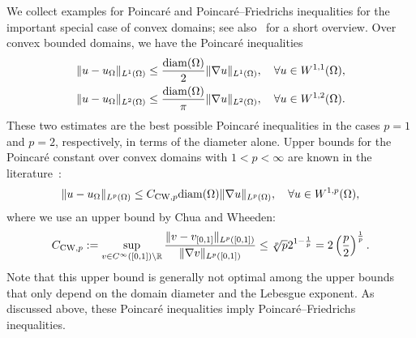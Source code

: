 \documentclass[12pt,a4paper]{article}
\begin{document}
We collect examples for Poincar\'e and Poincar\'e--Friedrichs inequalities for the important special case of convex domains; 
see also~\cite[Lemma~3.24]{ern2021finite} for a short overview. 
Over convex bounded domains, we have the Poincar\'e inequalities~\cite{bebendorf2003note,acosta2004optimal} 
\begin{align}\label{math:acostaduran}
    \| u - u_{\Omega} \|_{L^{1}(\Omega)}
    \leq 
    \frac{{\operatorname{diam}}(\Omega)}{2}
    \| \nabla u \|_{L^{1}(\Omega)}
    ,
    \quad 
    \forall 
    u \in W^{1,1}(\Omega)
    ,
    \\
    \| u - u_{\Omega} \|_{L^{2}(\Omega)} \label{math:bebendorf}
    \leq 
    \frac{{\operatorname{diam}}(\Omega)}{\pi}
    \| \nabla u \|_{L^{2}(\Omega)}
    ,
    \quad 
    \forall 
    u \in W^{1,2}(\Omega)
    .
\end{align}
These two estimates are the best possible Poincar\'e inequalities in the cases $p=1$ and $p=2$, respectively, in terms of the diameter alone. 
Upper bounds for the Poincar\'e constant over convex domains with $1 < p < \infty$ are known in the literature~\cite[Theorem~1.1, Theorem~1.2]{chua2006estimates}:
\begin{align}\label{math:chuawheeden}
    \| u - u_{\Omega} \|_{L^{p}(\Omega)}
    \leq 
    C_{{\rm CW},p}
    {\operatorname{diam}}(\Omega)
    \| \nabla u \|_{L^{p}(\Omega)}
    ,
    \quad 
    \forall 
    u \in W^{1,p}(\Omega)
    ,
\end{align}
where we use an upper bound by Chua and Wheeden:
\begin{align}
    C_{{\rm CW},p} 
    := 
    \sup\limits_{ v \in C^\infty([0,1]) \setminus {\mathbb R} } 
    \frac{ 
        \| v - v_{[0,1]} \|_{L^{p}([0,1])} 
    }{ 
        \| \nabla v \|_{L^{p}([0,1])} 
    }
    \leq 
    \sqrt[p]{p} 2^{1-\frac 1 p}
    =
    2
    \left( \frac p 2 \right)^{\frac 1 p}
    .
\end{align}
Note that this upper bound is generally not optimal among the upper bounds that only depend on the domain diameter and the Lebesgue exponent.
As discussed above, these Poincar\'e inequalities imply Poincar\'e--Friedrichs inequalities. 
\end{document}
